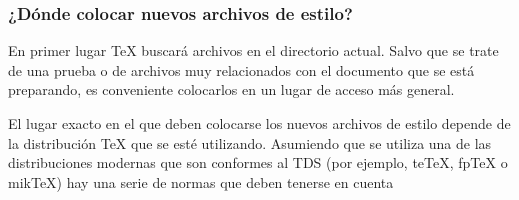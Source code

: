 	\subsubsection{¿D\'onde colocar nuevos archivos de estilo?}
	
	En primer lugar \TeX{} buscar\'a archivos en el directorio
	actual. Salvo que se trate de una prueba o de archivos muy
	relacionados con el documento que se est\'a preparando, es conveniente
	colocarlos en un lugar de acceso m\'as general.

	El lugar exacto en el que deben colocarse los nuevos archivos de
	estilo depende de la distribuci\'on \TeX{} que se est\'e
	utilizando. Asumiendo que se utiliza una de las distribuciones
	modernas que son conformes al TDS (por ejemplo, te\TeX{}, fp\TeX{} o
	mik\TeX{}) hay una serie de normas que deben tenerse en cuenta

